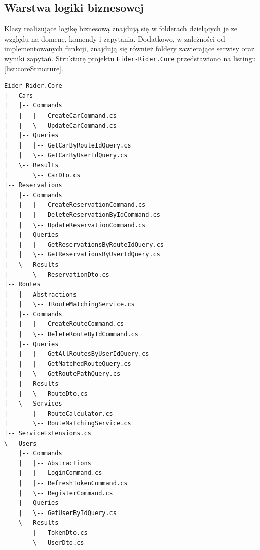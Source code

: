\subsection{Warstwa logiki biznesowej}
Klasy realizujące logikę biznesową znajdują się w folderach dzielących je ze względu na domenę, komendy i zapytania.
Dodatkowo, w zależności od implementowanych funkcji, znajdują się również foldery zawierające serwisy oraz wyniki zapytań.
Strukturę projektu \texttt{Eider-Rider.Core} przedstawiono na listingu \ref{list:coreStructure}.

\begin{lstlisting}[label=list:coreStructure,caption=Struktura projektu logiki biznesowej,style=folderview]
Eider-Rider.Core
|-- Cars
|   |-- Commands
|   |   |-- CreateCarCommand.cs
|   |   \-- UpdateCarCommand.cs
|   |-- Queries
|   |   |-- GetCarByRouteIdQuery.cs
|   |   \-- GetCarByUserIdQuery.cs
|   \-- Results
|       \-- CarDto.cs
|-- Reservations
|   |-- Commands
|   |   |-- CreateReservationCommand.cs
|   |   |-- DeleteReservationByIdCommand.cs
|   |   \-- UpdateReservationCommand.cs
|   |-- Queries
|   |   |-- GetReservationsByRouteIdQuery.cs
|   |   \-- GetReservationsByUserIdQuery.cs
|   \-- Results
|       \-- ReservationDto.cs
|-- Routes
|   |-- Abstractions
|   |   \-- IRouteMatchingService.cs
|   |-- Commands
|   |   |-- CreateRouteCommand.cs
|   |   \-- DeleteRouteByIdCommand.cs
|   |-- Queries
|   |   |-- GetAllRoutesByUserIdQuery.cs
|   |   |-- GetMatchedRouteQuery.cs
|   |   \-- GetRoutePathQuery.cs
|   |-- Results
|   |   \-- RouteDto.cs
|   \-- Services
|       |-- RouteCalculator.cs
|       \-- RouteMatchingService.cs
|-- ServiceExtensions.cs
\-- Users
    |-- Commands
    |   |-- Abstractions
    |   |-- LoginCommand.cs
    |   |-- RefreshTokenCommand.cs
    |   \-- RegisterCommand.cs
    |-- Queries
    |   \-- GetUserByIdQuery.cs
    \-- Results
        |-- TokenDto.cs
        \-- UserDto.cs
\end{lstlisting}

